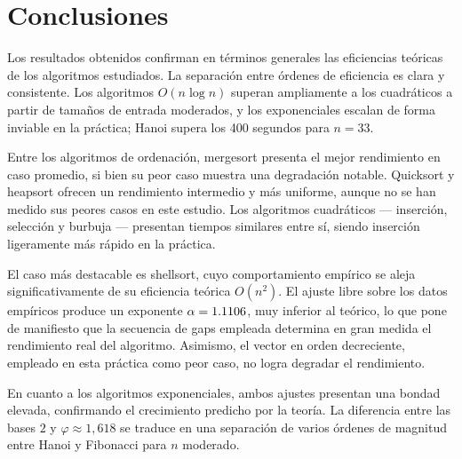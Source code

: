 \documentclass[12pt]{article}
\begin{document}
\section{Conclusiones}

Los resultados obtenidos confirman en términos generales las eficiencias teóricas
de los algoritmos estudiados. La separación entre órdenes de eficiencia es clara
y consistente. Los algoritmos $O(n \log n)$ superan ampliamente a los cuadráticos
a partir de tamaños de entrada moderados, y los exponenciales escalan de forma
inviable en la práctica; Hanoi supera los 400 segundos para $n=33$.

Entre los algoritmos de ordenación, mergesort presenta el mejor rendimiento en
caso promedio, si bien su peor caso muestra una degradación notable. Quicksort
y heapsort ofrecen un rendimiento intermedio y más uniforme, aunque no se han
medido sus peores casos en este estudio. Los algoritmos cuadráticos — inserción,
selección y burbuja — presentan tiempos similares entre sí, siendo inserción
ligeramente más rápido en la práctica.

El caso más destacable es shellsort, cuyo comportamiento empírico se aleja
significativamente de su eficiencia teórica $O(n^2)$. El ajuste libre sobre
los datos empíricos produce un exponente $\alpha = \num{1.1106}$, muy
inferior al teórico, lo que pone de manifiesto que la secuencia de gaps empleada
determina en gran medida el rendimiento real del algoritmo. Asimismo, el vector
en orden decreciente, empleado en esta práctica como peor caso, no logra
degradar el rendimiento.

En cuanto a los algoritmos exponenciales, ambos ajustes presentan una bondad
elevada, confirmando el crecimiento predicho por la teoría. La diferencia entre
las bases $2$ y $\varphi \approx 1{,}618$ se traduce en una separación de varios
órdenes de magnitud entre Hanoi y Fibonacci para $n$ moderado.

 
\end{document}

